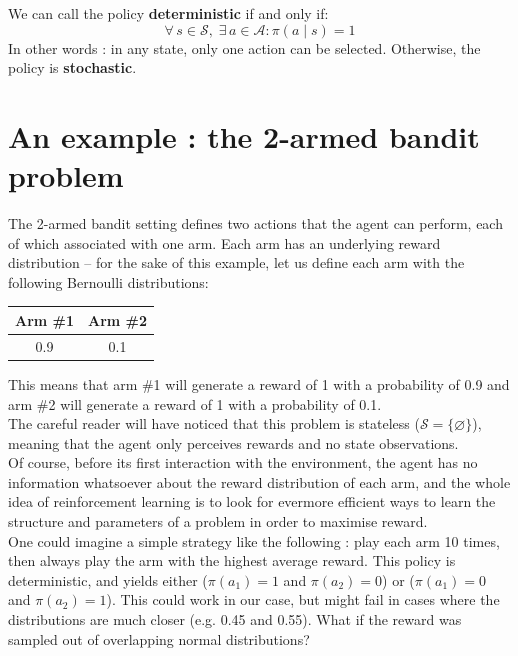 We can call the policy \textbf{deterministic} if and only if:
\begin{equation}
\forall\, s \in \mathcal{S},\; \exists\, a \in \mathcal{A} : \pi(a \mid s) = 1
\end{equation}
\noindent In other words : in any state, only one action can be selected.
Otherwise, the policy is \textbf{stochastic}.

\section{An example : the 2-armed bandit problem}
\label{sec:rl_example}
The 2-armed bandit setting defines two actions that the agent can perform,
each of which associated with one arm. Each arm has an underlying reward
distribution -- for the sake of this example, let us define each arm with the
following Bernoulli distributions: 

\begin{table}[H]
	\centering
	\begin{tabular}{c|c}
		Arm \#1 & Arm \#2 \\ \hline
		0.9 & 0.1
	\end{tabular}
\end{table}

\noindent This means that arm \#1 will generate a reward of 1 with a probability
of 0.9 and arm \#2 will generate a reward of 1 with a probability of 0.1.\\

The careful reader will have noticed that this problem is stateless 
($\mathcal{S} = \{\varnothing\}$), meaning that the agent only perceives
rewards and no state observations.\\

Of course, before its first interaction with the environment, the agent has no
information whatsoever about the reward distribution of each arm, and the whole
idea of reinforcement learning is to look for evermore efficient ways to learn
the structure and parameters of a problem in order to maximise reward.\\

One could imagine a simple strategy like the following : play each arm 10 times,
then always play the arm with the highest average reward. This policy is
deterministic, and yields either ($ \pi(a_1) = 1$ and $\pi(a_2) = 0$) or
($\pi(a_1) = 0$ and $\pi(a_2) = 1$). This could work in
our case, but might fail in cases where the distributions are much closer
(e.g. 0.45 and 0.55). What if the reward was sampled out of overlapping normal
distributions?\\

